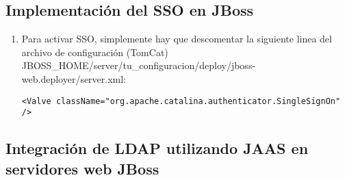 	\subsection{Implementación del SSO en JBoss}
	\begin{enumerate}
		\item Para activar SSO, simplemente hay que descomentar la siguiente
linea del archivo de configuración (TomCat)
JBOSS\_HOME/server/tu\_configuracion/deploy/jboss-web.deployer/server.xml:
\begin{lstlisting}
<Valve className="org.apache.catalina.authenticator.SingleSignOn" /> 
\end{lstlisting}

	\end{enumerate}
	\subsection{Integración de LDAP utilizando JAAS en servidores web JBoss}
